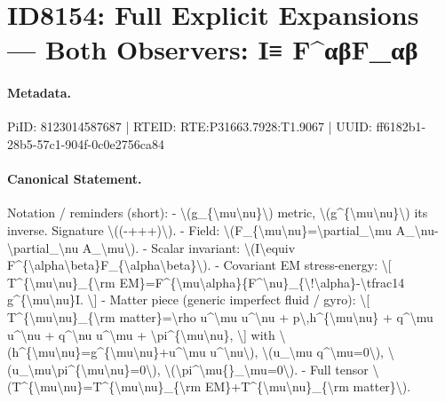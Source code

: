 \section*{ID8154: Full Explicit Expansions — Both Observers: I≡ F\textasciicircum{}αβF\_αβ}
\paragraph{Metadata.}
PiID: 8123014587687 | RTEID: RTE:P31663.7928:T1.9067 | UUID: ff6182b1-28b5-57c1-904f-0c0e2756ca84

\paragraph{Canonical Statement.}
Notation / reminders (short): - \textbackslash{}(g\_\{\textbackslash{}mu\textbackslash{}nu\}\textbackslash{}) metric, \textbackslash{}(g\textasciicircum{}\{\textbackslash{}mu\textbackslash{}nu\}\textbackslash{}) its inverse. Signature \textbackslash{}((-+++)\textbackslash{}). - Field: \textbackslash{}(F\_\{\textbackslash{}mu\textbackslash{}nu\}=\textbackslash{}partial\_\textbackslash{}mu A\_\textbackslash{}nu-\textbackslash{}partial\_\textbackslash{}nu A\_\textbackslash{}mu\textbackslash{}). - Scalar invariant: \textbackslash{}(I\textbackslash{}equiv F\textasciicircum{}\{\textbackslash{}alpha\textbackslash{}beta\}F\_\{\textbackslash{}alpha\textbackslash{}beta\}\textbackslash{}). - Covariant EM stress-energy: \textbackslash{}[ T\textasciicircum{}\{\textbackslash{}mu\textbackslash{}nu\}\_\{\textbackslash{}rm EM\}=F\textasciicircum{}\{\textbackslash{}mu\textbackslash{}alpha\}\{F\textasciicircum{}\textbackslash{}nu\}\_\{\textbackslash{}!\textbackslash{}alpha\}-\textbackslash{}tfrac14 g\textasciicircum{}\{\textbackslash{}mu\textbackslash{}nu\}I. \textbackslash{}] - Matter piece (generic imperfect fluid / gyro): \textbackslash{}[ T\textasciicircum{}\{\textbackslash{}mu\textbackslash{}nu\}\_\{\textbackslash{}rm matter\}=\textbackslash{}rho u\textasciicircum{}\textbackslash{}mu u\textasciicircum{}\textbackslash{}nu + p\textbackslash{},h\textasciicircum{}\{\textbackslash{}mu\textbackslash{}nu\} + q\textasciicircum{}\textbackslash{}mu u\textasciicircum{}\textbackslash{}nu + q\textasciicircum{}\textbackslash{}nu u\textasciicircum{}\textbackslash{}mu + \textbackslash{}pi\textasciicircum{}\{\textbackslash{}mu\textbackslash{}nu\}, \textbackslash{}] with \textbackslash{}(h\textasciicircum{}\{\textbackslash{}mu\textbackslash{}nu\}=g\textasciicircum{}\{\textbackslash{}mu\textbackslash{}nu\}+u\textasciicircum{}\textbackslash{}mu u\textasciicircum{}\textbackslash{}nu\textbackslash{}), \textbackslash{}(u\_\textbackslash{}mu q\textasciicircum{}\textbackslash{}mu=0\textbackslash{}), \textbackslash{}(u\_\textbackslash{}mu\textbackslash{}pi\textasciicircum{}\{\textbackslash{}mu\textbackslash{}nu\}=0\textbackslash{}), \textbackslash{}(\textbackslash{}pi\textasciicircum{}\textbackslash{}mu\{\}\_\textbackslash{}mu=0\textbackslash{}). - Full tensor \textbackslash{}(T\textasciicircum{}\{\textbackslash{}mu\textbackslash{}nu\}=T\textasciicircum{}\{\textbackslash{}mu\textbackslash{}nu\}\_\{\textbackslash{}rm EM\}+T\textasciicircum{}\{\textbackslash{}mu\textbackslash{}nu\}\_\{\textbackslash{}rm matter\}\textbackslash{}).

